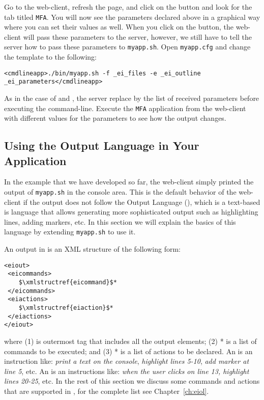 Go to the web-client, refresh the page, and click on the
\settingbutton button and look for the tab titled \texttt{MFA}.  You
will now see the parameters declared above in a graphical way where
you can set their values as well.  When you click on the \applybutton
button, the web-client will pass these parameters to the server,
however, we still have to tell the server how to pass these parameters
to \texttt{myapp.sh}. Open \texttt{myapp.cfg} and change the
 template to the following:

\medskip
\begin{lstlisting}
<cmdlineapp>./bin/myapp.sh -f _ei_files -e _ei_outline _ei_parameters</cmdlineapp>
\end{lstlisting}

\medskip
\noindent
As in the case of  and , the server
replace  by the list of received parameters before
executing the command-line. Execute the \texttt{MFA} application from
the web-client with different values for the parameters to see how the
output changes.

\subsection{Using the \ei Output Language in Your Application}

In the example that we have developed so far, the web-client simply
printed the output of \texttt{myapp.sh} in the console area. This is
the default behavior of the web-client if the output does not follow
the \ei Output Language (\eiol), which is a text-based is language
that allows generating more sophisticated output such as highlighting
lines, adding markers, etc.
%
In this section we will explain the basics of this language by
extending \texttt{myapp.sh} to use it.

An output in \eiol is an XML structure of the following form:

\medskip
\noindent
\begin{lstlisting}
<eiout> 
 <eicommands>
    $\xmlstructref{eicommand}$*
 </eicommands>
 <eiactions>
    $\xmlstructref{eiaction}$*
 </eiactions>
</eiout>
\end{lstlisting}

\medskip
\noindent
where (1)  is outermost tag that includes all the output
elements; (2) * is a list of commands to be
executed; and (3) * is a list of actions to be
declared.
%
An  is an instruction like: \emph{print a text
  on the console}, \emph{highlight lines 5-10}, \emph{add marker at
  line 5}, etc.
%
An  is an instructions like: \emph{when the
  user clicks on line 13, highlight lines 20-25}, etc.
%
In the rest of this section we discuss some commands and actions that
are supported in \eiol, for the complete list see
Chapter~\ref{ch:eiol}.

